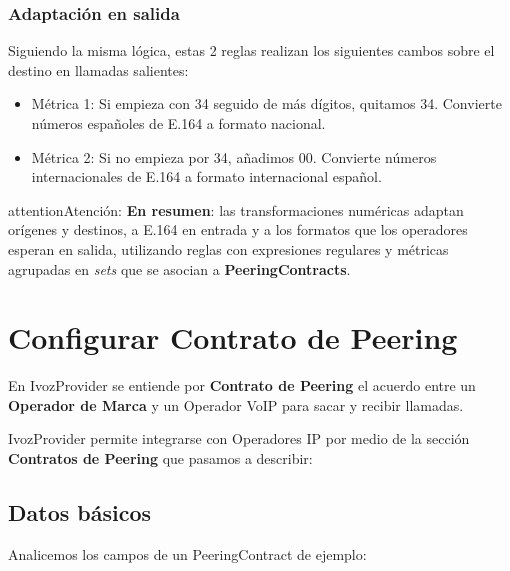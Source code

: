 \documentclass[letterpaper,10pt,spanish]{sphinxmanual}
\begin{document}
\subsubsection{Adaptación en salida}
\label{external_incoming_calls/numeric_transformations:id3}
\noindent{}

Siguiendo la misma lógica, estas 2 reglas realizan los siguientes cambos sobre el destino en llamadas salientes:
\begin{itemize}
\item {} 
Métrica 1: Si empieza con 34 seguido de más dígitos, quitamos 34. Convierte números españoles de E.164 a formato nacional.

\item {} 
Métrica 2: Si no empieza por 34, añadimos 00. Convierte números internacionales de E.164 a formato internacional español.

\end{itemize}

\begin{notice}{attention}{Atención:}
\textbf{En resumen}: las transformaciones numéricas adaptan orígenes y destinos, a E.164 en entrada y a los formatos que los operadores esperan en salida, utilizando reglas con expresiones regulares y métricas agrupadas en \emph{sets} que se asocian a \textbf{PeeringContracts}.
\end{notice}


\section{Configurar Contrato de Peering}
\label{external_incoming_calls/peering_contracts:configurar-contrato-de-peering}\label{external_incoming_calls/peering_contracts::doc}\label{external_incoming_calls/peering_contracts:peering-contracts}
En IvozProvider se entiende por \textbf{Contrato de Peering} el acuerdo entre un \textbf{Operador de Marca} y un Operador VoIP para sacar y recibir llamadas.

IvozProvider permite integrarse con Operadores IP por medio de la sección \textbf{Contratos de Peering} que pasamos a describir:



\subsection{Datos básicos}
\label{external_incoming_calls/peering_contracts:datos-basicos}
Analicemos los campos de un PeeringContract de ejemplo:
\end{document}

